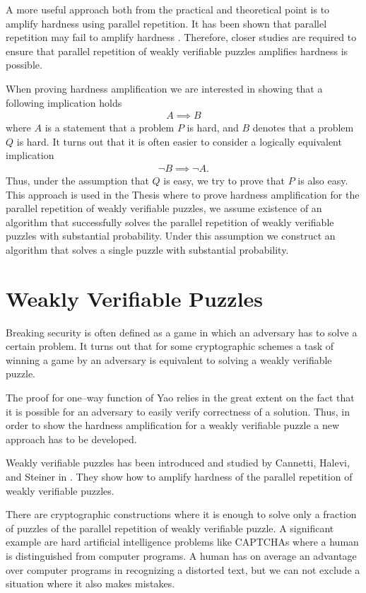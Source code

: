 \documentclass[11pt,a4paper,titlepage]{memoir}
\begin{document}
A more useful approach both from the practical and theoretical point is to amplify hardness using parallel repetition.
It has been shown that parallel repetition may fail to amplify hardness \cite{bellare1997does}.
Therefore, closer studies are required to ensure that parallel repetition of weakly verifiable puzzles amplifies hardness is possible.

When proving hardness amplification we are interested in showing that a following implication holds
\begin{align*}
  A \implies B
\end{align*}
where $A$ is a statement that a problem $P$ is hard, and $B$ denotes that a problem $Q$ is hard.
It turns out that it is often easier to consider a logically equivalent implication
\begin{align*}
  \lnot B \implies \lnot A.
\end{align*}
Thus, under the assumption that $Q$ is easy, we try to prove that $P$ is also easy.
This approach is used in the Thesis where to prove hardness amplification for the parallel repetition of weakly verifiable puzzles,
we assume existence of an algorithm that successfully solves the parallel repetition of weakly verifiable puzzles with substantial probability.
Under this assumption we construct an algorithm that solves a single puzzle with substantial probability.

\section{Weakly Verifiable Puzzles}
Breaking security is often defined as a game in which an adversary has to solve a certain problem.
It turns out that for some cryptographic schemes a task of winning a game by an adversary
is equivalent to solving a weakly verifiable puzzle.

The proof for one--way function of Yao relies in the great extent on the fact that it is possible
for an adversary to easily verify correctness of a solution. Thus, in order to show the hardness
amplification for a weakly verifiable puzzle a new approach has to be developed.

Weakly verifiable puzzles has been introduced and studied by Cannetti, Halevi, and Steiner in \cite{canetti2004hardness}.
They show how to amplify hardness of the parallel repetition of weakly verifiable puzzles.

There are cryptographic constructions where it is enough to solve only a fraction of puzzles of the parallel repetition of weakly verifiable puzzle.
A significant example are hard artificial intelligence problems like CAPTCHAs where a human is distinguished from computer programs.
A human has on average an advantage over computer programs in recognizing a distorted text, but we can not exclude a situation where it also makes mistakes.
\end{document}
